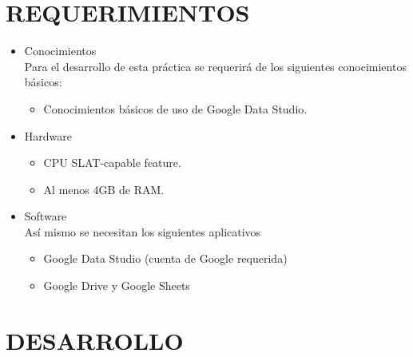 \documentclass[12pt,letterpaper]{article}
\begin{document}
    \section{REQUERIMIENTOS}
    \begin{itemize}
        \item Conocimientos\\
        Para el desarrollo de esta práctica se requerirá de los siguientes conocimientos básicos:
        \begin{itemize} 
            \item Conocimientos básicos de uso de Google Data Studio.
        \end{itemize}
        \item Hardware
        \begin{itemize}
            \item CPU SLAT-capable feature.
            \item Al menos 4GB de RAM.
        \end{itemize}
        \item Software\\
        Así mismo se necesitan los siguientes aplicativos
        \begin{itemize}
            \item Google Data Studio (cuenta de Google requerida)
            \item Google Drive y Google Sheets
        \end{itemize}
    \end{itemize}

    \newpage
    \section{DESARROLLO}
\end{document}
